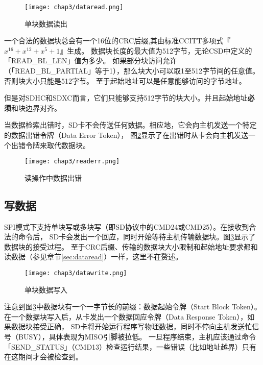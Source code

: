 \begin{figure}[!htb]
    \centering
    \texttt{[image: chap3/dataread.png]}
    \\
    \caption{单块数据读出} \label{fig:dataread}
\end{figure}

一个合法的数据块总会有一个16位的CRC后缀,其由标准CCITT多项式『$x^{16} + x^{12} + x^5 + 1$』生成。
数据块长度的最大值为512字节，无论CSD中定义的「READ\_BL\_LEN」值为多少。
如果部分块访问允许（「READ\_BL\_PARTIAL」等于1），那么块大小可以取1至512字节间的任意值。否则块大小只能是512字节。
至于起始地址可以是任意能够访问的字节地址。

但是对SDHC和SDXC而言，它们只能够支持512字节的块大小。并且起始地址\textbf{必须}和块边界对齐。

当数据检索出错时，SD卡不会传送任何数据。相应地，它会向主机发送一个特定的数据出错令牌（Data Error Token），
图\ref{fig:readerr}显示了在出错时从卡会向主机发送一个出错令牌来取代数据块。

\begin{figure}[!htb]
    \centering
    \texttt{[image: chap3/readerr.png]}
    \\
    \caption{读操作中数据出错} \label{fig:readerr}
\end{figure}

\subsection{写数据}
\label{sec:datawrite}

SPI模式下支持单块写或多块写（即SD协议中的CMD24或CMD25）。在接收到合法的命令后，
SD卡会发出一个回应，同时开始等待主机传输数据块。图\ref{fig:datawrite}显示了数据块的接受过程。
至于CRC后缀、传输的数据块大小限制和起始地址要求都和读数据（参见章节\ref{sec:dataread}）一样，这里不在赘述。

\begin{figure}[!htb]
    \centering
    \texttt{[image: chap3/datawrite.png]}
    \\
    \caption{单块数据写入} \label{fig:datawrite}
\end{figure}

注意到图\ref{fig:datawrite}中数据块有一个一字节长的前缀：数据起始令牌（Start Block Token）。
在一个数据块写入后，从卡发出一个数据回应令牌（Data Response Token），如果数据块接受正确，
SD卡将开始运行程序写物理数据，同时不停向主机发送忙信号（BUSY），具体表现为MISO引脚被拉低。
一旦程序结束，主机应该通过命令「SEND\_STATUS」（CMD13）检查运行结果，一些错误（比如地址越界）只有在这期间才会被检查到。

